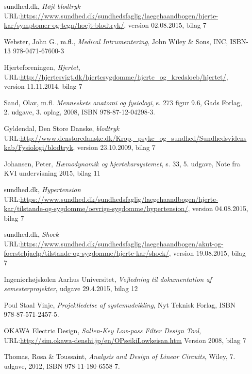 \begin{thebibliography}{9}
	
	sundhed.dk,
	\emph{Højt blodtryk}
	URL:\url{https://www.sundhed.dk/sundhedsfaglig/laegehaandbogen/hjerte-kar/symptomer-og-tegn/hoejt-blodtryk/},
	version 02.08.2015,
	bilag 7
	
	Webster, John G., m.fl.,
	\emph{Medical Intrumentering},
	John Wiley \& Sons, INC, ISBN-13 978-0471-67600-3
	 
	 
	Hjerteforeningen,
	\emph{Hjertet},
	URL:\url{http://hjertesvigt.dk/hjertesygdomme/hjerte_og_kredsloeb/hjertet/},
	version 11.11.2014,
	bilag 7
	
	Sand, Olav, m.fl.
	\emph{Menneskets anatomi og fysiologi},
	s. 273 figur 9.6,
	Gads Forlag,
	2. udgave, 3. oplag,
	2008, ISBN 978-87-12-04298-3. 
	
	Gyldendal, Den Store Danske,
	\emph{blodtryk}
	URL:\url{http://www.denstoredanske.dk/Krop,_psyke_og_sundhed/Sundhedsvidenskab/Fysiologi/blodtryk},
	version 23.10.2009, 
	bilag 7
	
	Johansen, Peter,
	\emph{Hæmodynamik og hjertekarsystemet},
	s. 33,
	5. udgave,
	Note fra KVI undervisning 2015,
	bilag 11
	
	sundhed.dk,
	\emph{Hypertension}
	URL:\url{https://www.sundhed.dk/sundhedsfaglig/laegehaandbogen/hjerte-kar/tilstande-og-sygdomme/oevrige-sygdomme/hypertension/},
	version 04.08.2015,
	bilag 7
	
	sundhed.dk,
	\emph{Shock}
	URL:\url{https://www.sundhed.dk/sundhedsfaglig/laegehaandbogen/akut-og-foerstehjaelp/tilstande-og-sygdomme/hjerte-kar/shock/},
	version 19.08.2015,
	bilag 7
	
	Ingeniørhøjskolen Aarhus Universitet,
	\emph{Vejledning til dokumentation af semesterprojekter},
	udgave 29.4.2015,
	bilag 12
	
	
	Poul Staal Vinje,
	\emph{Projektledelse af systemudvikling},
	Nyt Teknisk Forlag,
	ISBN 978-87-571-2457-5.
	
	OKAWA Electric Design,
	\emph{Sallen-Key Low-pass Filter Design Tool},
	URL:\url{http://sim.okawa-denshi.jp/en/OPseikiLowkeisan.htm}
	Version 2008,
	bilag 7
	
	
	Thomas, Rosa \& Toussaint,
	\emph{Analysis and Design of Linear Circuits},
	Wiley,
	7. udgave, 
	2012, ISBN  978-11-180-6558-7. 
	
	
\end{thebibliography}


